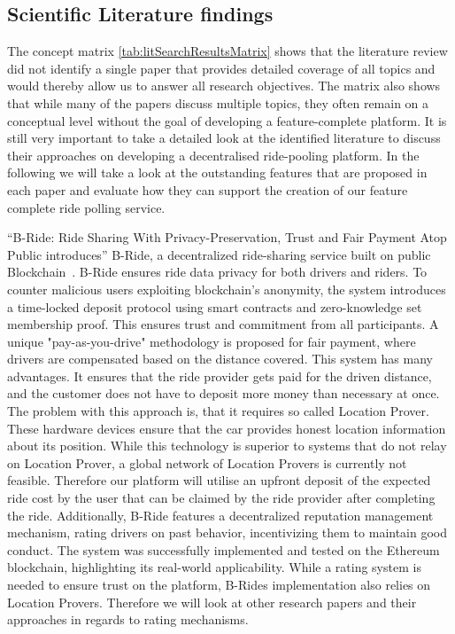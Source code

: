 \subsection{Scientific Literature findings}
The concept matrix \ref{tab:litSearchResultsMatrix} shows that the literature review did not identify a single paper that provides detailed coverage of all topics and would thereby allow us to answer all research objectives. The matrix also shows that while many of the papers discuss multiple topics, they often remain on a conceptual level without the goal of developing a feature-complete platform. It is still very important to take a detailed look at the identified literature to discuss their approaches on developing a decentralised ride-pooling platform. In the following we will take a look at the outstanding features that are proposed in each paper and evaluate how they can support the creation of our feature complete ride polling service.


``B-Ride: Ride Sharing With Privacy-Preservation, Trust and Fair Payment Atop Public
introduces'' B-Ride, a decentralized ride-sharing service built on public Blockchain~\cite{Baza.2021}. B-Ride ensures ride data privacy for both drivers and riders. To counter malicious users exploiting blockchain's anonymity, the system introduces a time-locked deposit protocol using smart contracts and zero-knowledge set membership proof. This ensures trust and commitment from all participants. A unique "pay-as-you-drive" methodology is proposed for fair payment, where drivers are compensated based on the distance covered. This 
system has many advantages. It ensures that the ride provider gets paid for the driven distance, and the customer does not have to deposit more money than necessary at once. The problem with this approach is, that it requires so called Location Prover. These hardware devices ensure that the car provides honest location information about its position. While this technology is superior to systems that do not relay on Location Prover, a global network of Location Provers is currently not feasible. Therefore our platform will utilise an upfront deposit of the expected ride cost by the user that can be claimed by the ride provider after completing the ride.
Additionally, B-Ride features a decentralized reputation management mechanism, rating drivers on past behavior, incentivizing them to maintain good conduct. The system was successfully implemented and tested on the Ethereum blockchain, highlighting its real-world applicability. While a rating system is needed to ensure trust on the platform, B-Rides implementation also relies on Location Provers. Therefore we will look at other research papers and their approaches in regards to rating mechanisms.

